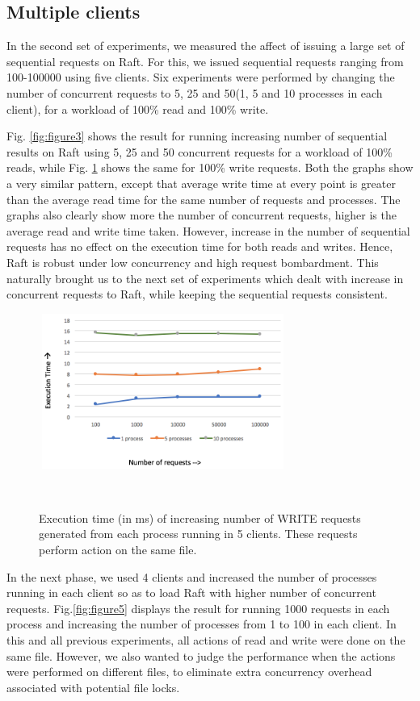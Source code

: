 \subsection{Multiple clients}

In the second set of experiments, we measured the affect of issuing a large set of sequential requests on Raft. For this, we issued sequential requests ranging from 100-100000 using five clients. Six experiments were performed by changing the number of concurrent requests to 5, 25 and 50(1, 5 and 10 processes in each client), for a workload of 100\% read and 100\% write.

Fig. \ref{fig:figure3} shows the result for running increasing number of sequential results on Raft using 5, 25 and 50 concurrent requests for a workload of 100\% reads, while Fig. \ref{fig:figure4} shows the same for 100\% write requests. Both the graphs show a very similar pattern, except that average write time at every point is greater than the average read time for the same number of requests and processes. The graphs also clearly show more the number of concurrent requests, higher is the average read and write time taken. However, increase in the number of sequential requests has no effect on the execution time for both reads and writes. Hence, Raft is robust under low concurrency and high request bombardment.
This naturally brought us to the next set of experiments which dealt with increase in concurrent requests to Raft, while keeping the sequential requests consistent.

\begin{figure}
\centering
\includegraphics[height=2in, width=3.2in]{images/F-HC-SF-W.png}
\caption{Execution time (in ms) of increasing number of WRITE requests generated from each process running in 5 clients. These requests perform action on the same file.}~\label{fig:figure4}
\end{figure}

In the next phase, we used 4 clients and increased the number of processes running in each client so as to load Raft with higher number of concurrent requests. Fig.\ref{fig:figure5} displays the result for running 1000 requests in each process and increasing the number of processes from 1 to 100 in each client. In this and all previous experiments, all actions of read and write were done on the same file. However, we also wanted to judge the performance when the actions were performed on different files, to eliminate extra concurrency overhead associated with potential file locks.


